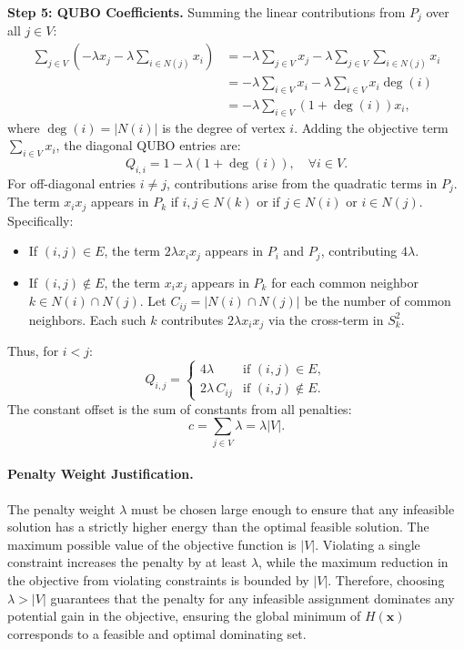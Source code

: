 \documentclass[12pt]{article}
\begin{document}
\textbf{Step 5: QUBO Coefficients.}
Summing the linear contributions from $P_j$ over all $j \in V$:
\begin{align}
\sum_{j \in V} \left( -\lambda x_j - \lambda \sum_{i \in N(j)} x_i \right) &= -\lambda \sum_{j \in V} x_j - \lambda \sum_{j \in V} \sum_{i \in N(j)} x_i \\
&= -\lambda \sum_{i \in V} x_i - \lambda \sum_{i \in V} x_i \deg(i) \\
&= -\lambda \sum_{i \in V} \left( 1 + \deg(i) \right) x_i,
\end{align}
where $\deg(i) = |N(i)|$ is the degree of vertex $i$. Adding the objective term $\sum_{i \in V} x_i$, the diagonal QUBO entries are:
\begin{equation}
Q_{i,i} = 1 - \lambda \left( 1 + \deg(i) \right), \quad \forall i \in V.
\end{equation}
For off-diagonal entries $i \neq j$, contributions arise from the quadratic terms in $P_j$. The term $x_i x_j$ appears in $P_k$ if $i, j \in N(k)$ or if $j \in N(i)$ or $i \in N(j)$. Specifically:
\begin{itemize}
    \item If $(i, j) \in E$, the term $2\lambda x_i x_j$ appears in $P_i$ and $P_j$, contributing $4\lambda$.
    \item If $(i, j) \notin E$, the term $x_i x_j$ appears in $P_k$ for each common neighbor $k \in N(i) \cap N(j)$. Let $C_{ij} = |N(i) \cap N(j)|$ be the number of common neighbors. Each such $k$ contributes $2\lambda x_i x_j$ via the cross-term in $S_k^2$.
\end{itemize}
Thus, for $i < j$:
\begin{equation}
Q_{i,j} = \begin{cases}
4\lambda & \text{if } (i, j) \in E, \\
2\lambda \, C_{ij} & \text{if } (i, j) \notin E.
\end{cases}
\end{equation}
The constant offset is the sum of constants from all penalties:
\begin{equation}
c = \sum_{j \in V} \lambda = \lambda |V|.
\end{equation}

\paragraph{Penalty Weight Justification.}
The penalty weight $\lambda$ must be chosen large enough to ensure that any infeasible solution has a strictly higher energy than the optimal feasible solution. The maximum possible value of the objective function is $|V|$. Violating a single constraint increases the penalty by at least $\lambda$, while the maximum reduction in the objective from violating constraints is bounded by $|V|$. Therefore, choosing $\lambda > |V|$ guarantees that the penalty for any infeasible assignment dominates any potential gain in the objective, ensuring the global minimum of $H(\mathbf{x})$ corresponds to a feasible and optimal dominating set.
\end{document}
